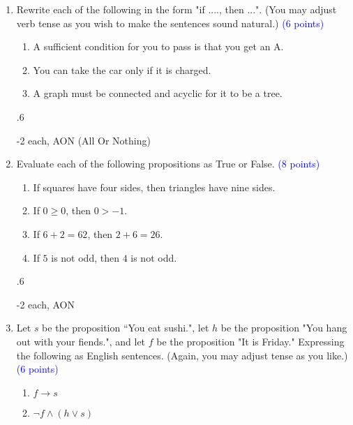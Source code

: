 \documentclass{article}
\newcommand{\pt}[1]{\textcolor{blue}{(#1 points)}}
\newenvironment{rubric}
{
\par
\begin{spacing}{.6}
\begin{itshape}
\color{red}

}
{
\end{itshape}
\end{spacing}
\par
}
\begin{document}
\begin{enumerate}

    \item Rewrite each of the following in the form "if ...., then ...".  (You may adjust verb tense as you wish to make the sentences sound natural.) \pt 6
    
    \begin{enumerate}
        \item A sufficient condition for you to pass is that you get an A.
        
        \item You can take the car only if it is charged.
        
        \item A graph must be connected and acyclic for it to be a tree.
    \end{enumerate}
    
    \begin{rubric}
    -2 each, AON (All Or Nothing)
    \end{rubric}
    
    \item Evaluate each of the following propositions as True or False. \pt 8
    \begin{enumerate}
        \item If squares have four sides, then triangles have nine sides.
        \item If $0 \geq 0$, then $0 > -1$.
        \item If $6+2 = 62$, then $2+6=26$.
        \item If $5$ is not odd, then $4$ is not odd. 
    \end{enumerate}
    
    \begin{rubric}
    -2 each, AON
    \end{rubric}
    
    \item Let $s$ be the proposition ``You eat sushi.", let $h$ be the proposition "You hang out with your fiends.", and let $f$ be the proposition "It is Friday." Expressing the following as English sentences. (Again, you may adjust tense as you like.) \pt 6
    
    \begin{enumerate}
        \item $f \rightarrow s$
        \item $\lnot f \wedge (h \vee s)$
    \end{enumerate}
    

\end{enumerate}
\end{document}

